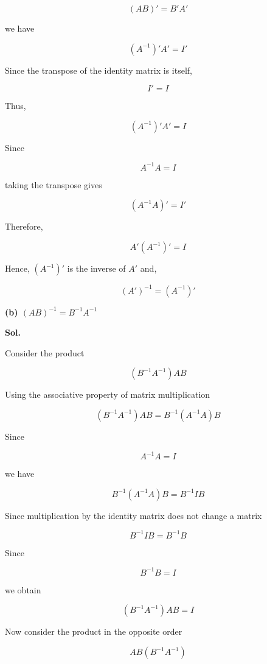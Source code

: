 \documentclass[12pt]{article}
\begin{document}
\[
(AB)'=B'A'
\]

\noindent
we have

\[
(A^{-1})'A'=I'
\]

\noindent
Since the transpose of the identity matrix is itself,

\[
I'=I
\]

\noindent
Thus,

\[
(A^{-1})'A'=I
\]

\noindent
Since

\[
A^{-1}A=I
\]

\noindent
taking the transpose gives

\[
(A^{-1}A)'=I'
\]

\noindent
Therefore,

\[
A'(A^{-1})'=I
\]

\noindent
Hence, \((A^{-1})'\) is the inverse of \(A'\) and,

\[
\boxed{
(A')^{-1}=(A^{-1})'
}
\]

\vspace{1cm}

\noindent
\textbf{(b) \((AB)^{-1}=B^{-1}A^{-1}\)}

\vspace{0.5cm}

\noindent
\textbf{Sol.}

\vspace{0.3cm}

\noindent
Consider the product

\[
(B^{-1}A^{-1})AB
\]

\noindent
Using the associative property of matrix multiplication

\[
(B^{-1}A^{-1})AB
=
B^{-1}(A^{-1}A)B
\]

\noindent
Since

\[
A^{-1}A=I
\]

\noindent
we have

\[
B^{-1}(A^{-1}A)B
=
B^{-1}IB
\]

\noindent
Since multiplication by the identity matrix does not change a matrix

\[
B^{-1}IB
=
B^{-1}B
\]

\noindent
Since

\[
B^{-1}B=I
\]

\noindent
we obtain

\[
(B^{-1}A^{-1})AB
=
I
\]

\noindent
Now consider the product in the opposite order

\[
AB(B^{-1}A^{-1})
\]
\end{document}
